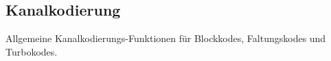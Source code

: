 

\subsection{Kanalkodierung}
Allgemeine Kanalkodierungs-Funktionen für Blockkodes, Faltungskodes und Turbokodes.
\label{kapitel:interface_kanalkodierung}





